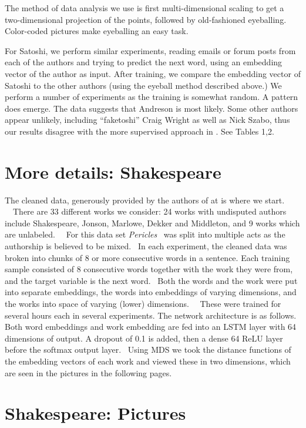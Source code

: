 \documentclass{article}%
\begin{document}
The method of data analysis we use is first multi-dimensional scaling to get a two-dimensional projection of the points, followed by old-fashioned eyeballing.  Color-coded pictures make eyeballing an easy task.  

For Satoshi, we perform similar experiments, reading emails or forum posts  from each of the
authors and trying to predict the next word, using an embedding vector of the
author as input. After training, we compare the embedding vector of Satoshi to
the other authors (using the eyeball method described above.) We perform a number of experiments as the training is somewhat random. A pattern does emerge.  The data
suggests that Andreson is most likely.  Some other authors appear unlikely, including ``faketoshi'' Craig
Wright as well as Nick Szabo, thus our results disagree with the more supervised approach in \cite{SG}. See Tables 1,2.  

\section{More details: Shakespeare}

The cleaned data, generously provided by the authors of \cite{RW} at
\cite{RWgithub} is where we start. \ \ There are 33 different works we consider:
24 works with undisputed authors include Shakespeare, Jonson, Marlowe, Dekker
and Middleton, and 9 works which are unlabeled. \ \ For this data set
\textit{Pericles} \ was split into multiple acts as the authorship is believed
to be mixed. \ In each experiment, the cleaned data was broken into chunks of
8 or more consecutive words in a sentence. Each training sample consisted of 8
consecutive words together with the work they were from, and the target variable is the
next word. \ Both the words and the work were put into separate embeddings,
the words into embeddings of varying dimensions, and the works
into space of varying (lower) dimensions. \ \ These were trained for several hours each in several experiments. 
The network architecture is as follows.  Both word embeddings and work embedding are fed into an LSTM layer with 64 dimensions of output.  A dropout of 0.1 is added, then a dense 64 ReLU layer before the softmax output layer.    
\ Using MDS we took the distance functions of the embedding vectors of each work
and viewed these in two dimensions, which are seen in the pictures in the following pages.  

\section{Shakespeare: Pictures}
\end{document}

